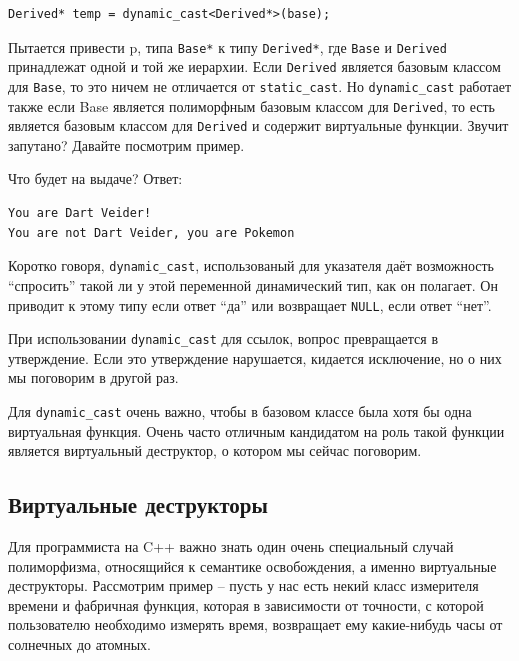 \documentclass[a4paper,12pt,oneside]{article}
\begin{document}
\begin{lstlisting}
Derived* temp = dynamic_cast<Derived*>(base);
\end{lstlisting}

Пытается привести p, типа \lstinline!Base*! к типу \lstinline!Derived*!, где \lstinline!Base! и \lstinline!Derived! принадлежат одной и той же иерархии. Если \lstinline!Derived! является базовым классом для \lstinline!Base!, то это ничем не отличается от \lstinline!static_cast!. Но \lstinline!dynamic_cast! работает также если Base является полиморфным базовым классом для \lstinline!Derived!, то есть является базовым классом для \lstinline!Derived! и содержит виртуальные функции. Звучит запутано? Давайте посмотрим пример.



Что будет на выдаче? Ответ:

\begin{lstlisting}[language=make]
You are Dart Veider!
You are not Dart Veider, you are Pokemon
\end{lstlisting}

Коротко говоря, \lstinline!dynamic_cast!, использованый для указателя даёт возможность ``спросить'' такой ли у этой переменной динамический тип, как он полагает. Он приводит к этому типу если ответ ``да'' или возвращает \lstinline!NULL!, если ответ ``нет''.

При использовании \lstinline!dynamic_cast! для ссылок, вопрос превращается в утверждение. Если это утверждение нарушается, кидается исключение, но о них мы поговорим в другой раз.

Для \lstinline!dynamic_cast! очень важно, чтобы в базовом классе была хотя бы одна виртуальная функция. Очень часто отличным кандидатом на роль такой функции является виртуальный деструктор, о котором мы сейчас поговорим.

\subsection{Виртуальные деструкторы}

Для программиста на C++ важно знать один очень специальный случай полиморфизма, относящийся к семантике освобождения, а именно виртуальные деструкторы. Рассмотрим пример – пусть у нас есть некий класс измерителя времени и фабричная функция, которая в зависимости от точности, с которой пользователю необходимо измерять время, возвращает ему какие-нибудь часы от солнечных до атомных.


\end{document}

